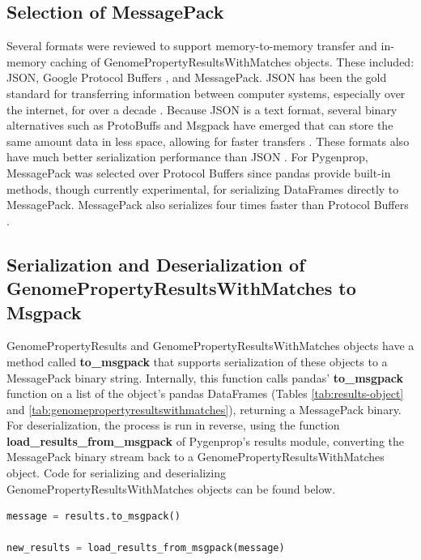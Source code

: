 \subsection{Selection of MessagePack}

Several formats were reviewed to support memory-to-memory transfer and in-memory caching of GenomePropertyResultsWithMatches objects. These included: JSON, Google Protocol Buffers \cite{varda2008protocol}, and MessagePack. JSON has been the gold standard for transferring information between computer systems, especially over the internet, for over a decade \cite{d4_softwareltd_2017}. Because JSON is a text format, several binary alternatives such as ProtoBuffs and Msgpack have emerged that can store the same amount data in less space, allowing for faster transfers \cite{furuhashi2013messagepack,varda2008protocol,krebs_2017,cooper_2010,bengtsson_24AD}. These formats also have much better serialization performance than JSON \cite{krebs_2017,cooper_2010,bengtsson_24AD}. For Pygenprop, MessagePack was selected over Protocol Buffers since pandas provide built-in methods, though currently experimental, for serializing DataFrames directly to MessagePack. MessagePack also serializes four times faster than Protocol Buffers \cite{cooper_2010}.

\subsection{Serialization and Deserialization of GenomePropertyResultsWithMatches to Msgpack}

GenomePropertyResults and GenomePropertyResultsWithMatches objects have a method called \textbf{to\_msgpack} that supports serialization of these objects to a MessagePack binary string. Internally, this function calls pandas' \textbf{to\_msgpack} function on a list of the object's pandas DataFrames (Tables \ref{tab:results-object} and \ref{tab:genomepropertyresultswithmatches}), returning a MessagePack binary. For deserialization, the process is run in reverse, using the function \textbf{load\_results\_from\_msgpack} of Pygenprop's results module, converting the MessagePack binary stream back to a GenomePropertyResultsWithMatches object. Code for serializing and deserializing GenomePropertyResultsWithMatches objects can be found below.

\begin{lstlisting}[language=Python]  
message = results.to_msgpack()

new_results = load_results_from_msgpack(message)
\end{lstlisting}


